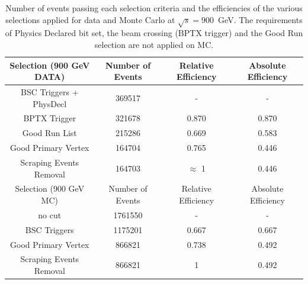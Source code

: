 \begin{table}[!ht]
  \begin{center}
    \begin{tabular}{|c|c|c|c|}
      \hline
      Selection (900 GeV DATA) & Number of Events  & Relative Efficiency & Absolute Efficiency\\
      \hline\hline
      BSC Triggers + PhysDecl  & 369517            & -                   & -      \\ 
      BPTX Trigger             & 321678		   & 0.870               & 0.870  \\
      Good Run List            & 215286		   & 0.669		 & 0.583  \\
      Good Primary Vertex      & 164704		   & 0.765		 & 0.446  \\
      Scraping Events Removal  & 164703		   & $\approx$ 1	 & 0.446  \\
      \hline
      \hline
      \hline
      \hline
      Selection (900 GeV MC)   & Number of Events  & Relative Efficiency & Absolute Efficiency\\
      \hline\hline
      no cut                   & 1761550           & -                   & -      \\ 
      BSC Triggers	       & 1175201	   & 0.667               & 0.667  \\ 
      Good Primary Vertex      & 866821		   & 0.738		 & 0.492  \\
      Scraping Events Removal  & 866821		   & 1			 & 0.492  \\
      \hline
  \end{tabular}
    \caption{Number of events passing each selection criteria and
      the efficiencies of the various selections applied for data and Monte Carlo at $\sqrt{s}=900$~GeV. 
      The requirements of Physics Declared bit set, the beam crossing (BPTX trigger) and the Good Run selection 
      are not applied on MC.}
    \label{tab:selectionefficiency_900}
  \end{center}
\end{table}


